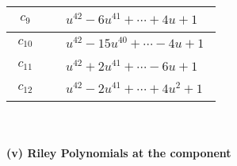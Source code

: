 \documentclass[1p]{elsarticle_modified}
\theoremstyle{definition}
\begin{document}
\begin{tabular}{m{50pt}|m{274pt}}
\hline $$\begin{aligned}c_{9}\end{aligned}$$&$\begin{aligned}
&u^{42}-6 u^{41}+\cdots+4 u+1
\end{aligned}$\\
\hline $$\begin{aligned}c_{10}\end{aligned}$$&$\begin{aligned}
&u^{42}-15 u^{40}+\cdots-4 u+1
\end{aligned}$\\
\hline $$\begin{aligned}c_{11}\end{aligned}$$&$\begin{aligned}
&u^{42}+2 u^{41}+\cdots-6 u+1
\end{aligned}$\\
\hline $$\begin{aligned}c_{12}\end{aligned}$$&$\begin{aligned}
&u^{42}-2 u^{41}+\cdots+4 u^2+1
\end{aligned}$\\
\hline
\end{tabular}\\~\\
\newpage\renewcommand{\arraystretch}{1}
\flushleft \textbf{(v) Riley Polynomials at the component}\newline \\
\end{document}
